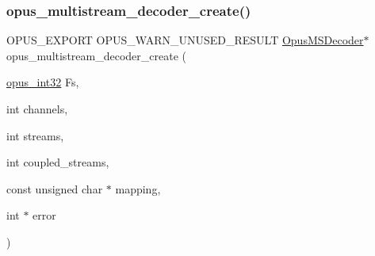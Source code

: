 \subsubsection{\texorpdfstring{opus\_multistream\_decoder\_create()}{opus\_multistream\_decoder\_create()}}
{\footnotesize\ttfamily O\+P\+U\+S\+\_\+\+E\+X\+P\+O\+RT O\+P\+U\+S\+\_\+\+W\+A\+R\+N\+\_\+\+U\+N\+U\+S\+E\+D\+\_\+\+R\+E\+S\+U\+LT \mbox{\hyperlink{group__opus__multistream_gad3497495deb9a8ace82e76cd4f93e0e4}{Opus\+M\+S\+Decoder}}$\ast$ opus\+\_\+multistream\+\_\+decoder\+\_\+create (\begin{DoxyParamCaption}\item[{\mbox{\hyperlink{opus__types_8h_aa4d309d6f80b99dbabebc8f98879ab9a}{opus\+\_\+int32}}}]{Fs,  }\item[{int}]{channels,  }\item[{int}]{streams,  }\item[{int}]{coupled\+\_\+streams,  }\item[{const unsigned char $\ast$}]{mapping,  }\item[{int $\ast$}]{error }\end{DoxyParamCaption})}

